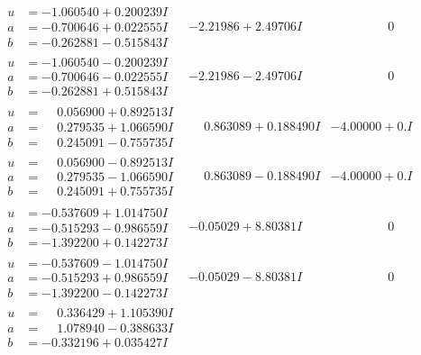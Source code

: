 \documentclass[1p]{elsarticle_modified}
\theoremstyle{definition}
\begin{document}
$$\begin{array}{c|c|c}
\begin{aligned}
u &= -1.060540 + 0.200239 I \\
a &= -0.700646 + 0.022555 I \\
b &= -0.262881 - 0.515843 I\end{aligned}
 & -2.21986 + 2.49706 I & \phantom{-0.000000 } 0 \\ \hline\begin{aligned}
u &= -1.060540 - 0.200239 I \\
a &= -0.700646 - 0.022555 I \\
b &= -0.262881 + 0.515843 I\end{aligned}
 & -2.21986 - 2.49706 I & \phantom{-0.000000 } 0 \\ \hline\begin{aligned}
u &= \phantom{-}0.056900 + 0.892513 I \\
a &= \phantom{-}0.279535 + 1.066590 I \\
b &= \phantom{-}0.245091 - 0.755735 I\end{aligned}
 & \phantom{-}0.863089 + 0.188490 I & -4.00000 + 0. I\phantom{ +0.000000I} \\ \hline\begin{aligned}
u &= \phantom{-}0.056900 - 0.892513 I \\
a &= \phantom{-}0.279535 - 1.066590 I \\
b &= \phantom{-}0.245091 + 0.755735 I\end{aligned}
 & \phantom{-}0.863089 - 0.188490 I & -4.00000 + 0. I\phantom{ +0.000000I} \\ \hline\begin{aligned}
u &= -0.537609 + 1.014750 I \\
a &= -0.515293 - 0.986559 I \\
b &= -1.392200 + 0.142273 I\end{aligned}
 & -0.05029 + 8.80381 I & \phantom{-0.000000 } 0 \\ \hline\begin{aligned}
u &= -0.537609 - 1.014750 I \\
a &= -0.515293 + 0.986559 I \\
b &= -1.392200 - 0.142273 I\end{aligned}
 & -0.05029 - 8.80381 I & \phantom{-0.000000 } 0 \\ \hline\begin{aligned}
u &= \phantom{-}0.336429 + 1.105390 I \\
a &= \phantom{-}1.078940 - 0.388633 I \\
b &= -0.332196 + 0.035427 I\end{aligned}

\end{array}$$
\end{document}
